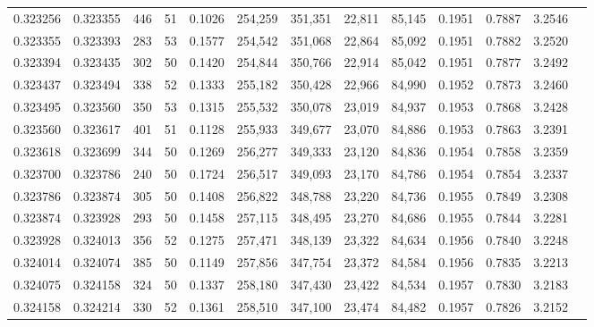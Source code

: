 \begin{tabular}{rrrrrrrrrrrrr}
0.323256 & 0.323355 &   446 &  51 &                                     0.1026 & 254,259 & 351,351 &  22,811 &  85,145 & 0.1951 & 0.7887 & 3.2546 \\
0.323355 & 0.323393 &   283 &  53 &                                     0.1577 & 254,542 & 351,068 &  22,864 &  85,092 & 0.1951 & 0.7882 & 3.2520 \\
0.323394 & 0.323435 &   302 &  50 &                                     0.1420 & 254,844 & 350,766 &  22,914 &  85,042 & 0.1951 & 0.7877 & 3.2492 \\
0.323437 & 0.323494 &   338 &  52 &                                     0.1333 & 255,182 & 350,428 &  22,966 &  84,990 & 0.1952 & 0.7873 & 3.2460 \\
0.323495 & 0.323560 &   350 &  53 &                                     0.1315 & 255,532 & 350,078 &  23,019 &  84,937 & 0.1953 & 0.7868 & 3.2428 \\
0.323560 & 0.323617 &   401 &  51 &                                     0.1128 & 255,933 & 349,677 &  23,070 &  84,886 & 0.1953 & 0.7863 & 3.2391 \\
0.323618 & 0.323699 &   344 &  50 &                                     0.1269 & 256,277 & 349,333 &  23,120 &  84,836 & 0.1954 & 0.7858 & 3.2359 \\
0.323700 & 0.323786 &   240 &  50 &                                     0.1724 & 256,517 & 349,093 &  23,170 &  84,786 & 0.1954 & 0.7854 & 3.2337 \\
0.323786 & 0.323874 &   305 &  50 &                                     0.1408 & 256,822 & 348,788 &  23,220 &  84,736 & 0.1955 & 0.7849 & 3.2308 \\
0.323874 & 0.323928 &   293 &  50 &                                     0.1458 & 257,115 & 348,495 &  23,270 &  84,686 & 0.1955 & 0.7844 & 3.2281 \\
0.323928 & 0.324013 &   356 &  52 &                                     0.1275 & 257,471 & 348,139 &  23,322 &  84,634 & 0.1956 & 0.7840 & 3.2248 \\
0.324014 & 0.324074 &   385 &  50 &                                     0.1149 & 257,856 & 347,754 &  23,372 &  84,584 & 0.1956 & 0.7835 & 3.2213 \\
0.324075 & 0.324158 &   324 &  50 &                                     0.1337 & 258,180 & 347,430 &  23,422 &  84,534 & 0.1957 & 0.7830 & 3.2183 \\
0.324158 & 0.324214 &   330 &  52 &                                     0.1361 & 258,510 & 347,100 &  23,474 &  84,482 & 0.1957 & 0.7826 & 3.2152 \\

\end{tabular}
